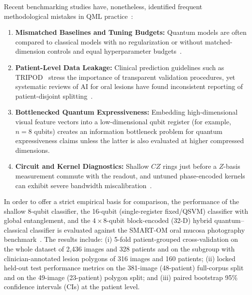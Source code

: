 \documentclass[conference]{IEEEtran}
\begin{document}
Recent benchmarking studies have, nonetheless, identified frequent methodological mistakes in QML practice~\cite{bowles2024better, huang2021power, kubler2021inductive}:
\begin{enumerate}
    \item \textbf{Mismatched Baselines and Tuning Budgets:} Quantum models are often compared to classical models with no regularization or without matched-dimension controls and equal hyperparameter budgets~\cite{bowles2024better, huang2021power}.
    \item \textbf{Patient-Level Data Leakage:} Clinical prediction guidelines such as TRIPOD~\cite{collins2015transparent} stress the importance of transparent validation procedures, yet systematic reviews of AI for oral lesions have found inconsistent reporting of patient-disjoint splitting~\cite{warin2022deep}.
    \item \textbf{Bottlenecked Quantum Expressiveness:} Embedding high-dimensional visual feature vectors into a low-dimensional qubit register (for example, $n=8$ qubits) creates an information bottleneck problem for quantum expressiveness claims unless the latter is also evaluated at higher compressed dimensions.
    \item \textbf{Circuit and Kernel Diagnostics:} Shallow $CZ$ rings just before a $Z$-basis measurement commute with the readout, and untuned phase-encoded kernels can exhibit severe bandwidth miscalibration~\cite{thanasilp2022subtleties, bharti2022noisy}.
\end{enumerate}

In order to offer a strict empirical basis for comparison, the performance of the shallow 8-qubit classifier, the 16-qubit (single-register fixed/QSVM) classifier with global entanglement, and the $4 \times 8$-qubit block-encoded (32-D) hybrid quantum--classical classifier is evaluated against the SMART-OM oral mucosa photography benchmark~\cite{smartom2026dataset}. The results include: (i) 5-fold patient-grouped cross-validation on the whole dataset of 2,436 images and 328 patients and on the subgroup with clinician-annotated lesion polygons of 316 images and 160 patients; (ii) locked held-out test performance metrics on the 381-image (48-patient) full-corpus split and on the 49-image (23-patient) polygon split; and (iii) paired bootstrap 95\% confidence intervals (CIs) at the patient level.
\end{document}
